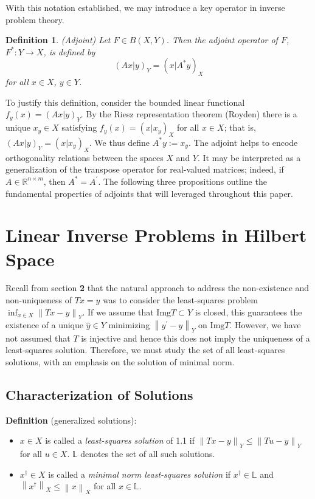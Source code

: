 \documentclass[12pt]{article}
\newcommand*{\norm}[1]{\left\lVert#1\right\rVert}
\newcommand{\Img}{\mathrm{Img}}
\newtheorem*{definition}{Definition}
\begin{document}
 With this notation established, we may introduce a key operator in inverse problem theory. 
 \begin{definition} 
 (Adjoint) Let $F \in B(X, Y)$. Then the adjoint operator of $F$, $F^*: Y \to X$, is defined by 
 	\begin{equation*} 
	(Ax|y)_Y = (x|A^*y)_X
 	\end{equation*} 
	for all $x \in X$, $y \in Y$. 
 \end{definition} 
To justify this definition, consider the bounded linear functional $f_y(x) = (Ax|y)_Y$. By the Riesz representation theorem (Royden) 
there is a unique $x_y \in X$ satisfying $f_y(x) = (x|x_y)_X$ for all $x \in X$; that is, $(Ax|y)_Y = (x|x_y)_X$. 
We thus define $A^*y := x_y$. The adjoint helps to encode orthogonality relations between the spaces $X$ and $Y$. 
It may be interpreted as a generalization of the transpose operator for real-valued matrices; indeed, if $A \in \mathbb{R}^{n \times m}$, 
then $A^* = A^\prime$. The following three propositions outline the fundamental properties of adjoints that will leveraged throughout
this paper. 



\section{Linear Inverse Problems in Hilbert Space}

 Recall from section \textbf{2} that the natural approach to address the non-existence and non-uniqueness of $Tx = y$ was to consider the least-squares problem $\inf_{x \in X} \norm{Tx - y}_Y$. If we assume that $\Img T \subset Y$ is closed, this guarantees the existence of a unique $\hat{y} \in Y$ minimizing $\norm{y^\prime - y}_Y$ on $\Img T$. However, we have not assumed that $T$ is injective and hence this does not imply the uniqueness of a least-squares solution. Therefore, we must study the set of all least-squares solutions, with an emphasis on the solution of minimal norm. 

\subsection{Characterization of Solutions}

 \textbf{Definition} (generalized solutions): 
 \begin{itemize}
 \item $x \in X$ is called a \textit{least-squares solution} of 1.1 if $\norm{Tx - y}_Y \leq \norm{Tu - y}_Y$ for all $u \in X$. $\mathbb{L}$ denotes the set of all such solutions. 
 \item $x^\dagger \in X$ is called a \textit{minimal norm least-squares solution} if $x^\dagger \in \mathbb{L}$ and $\norm{x^\dagger}_X \leq \norm{x}_X$ for all $x \in \mathbb{L}$. 
 \end{itemize} 
 
\end{document}
